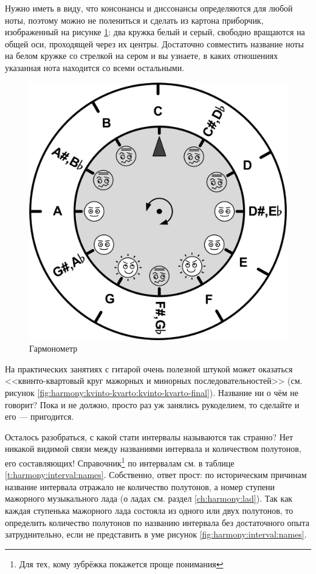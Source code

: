 Нужно иметь в виду, что консонансы и диссонансы определяются для любой ноты, поэтому можно не полениться и сделать из картона приборчик, изображенный на рисунке \ref{fig:harmony:interval:octave-kon-dis}: два кружка белый и серый, свободно вращаются на общей оси, проходящей через их центры. Достаточно совместить название ноты на белом кружке со стрелкой на сером и вы узнаете, в каких отношениях указанная нота находится со всеми остальными.

\begin{figure}[!ht]
    \centering
    \includegraphics[scale=0.7]{fig/intervals/octave-kon-dis} 
    \caption{Гармонометр}\label{fig:harmony:interval:octave-kon-dis}
\end{figure} 

На практических занятиях с гитарой очень полезной штукой может оказаться <<квинто-квартовый круг мажорных и минорных последовательностей>> (см. рисунок \ref{fig:harmony:kvinto-kvarto:kvinto-kvarto-final}). Название ни о чём не говорит? Пока и не должно, просто раз уж занялись рукоделием, то сделайте и его --- пригодится.

Осталось разобраться, с какой стати интервалы называются так странно? Нет никакой видимой связи между названиями интервала и количеством полутонов, его составляющих! Справочник\footnote{Для тех, кому зубрёжка покажется проще понимания} по интервалам см. в таблице \ref{t:harmony:interval:names}. Собственно, ответ прост: по историческим причинам название интервала отражало не количество полутонов, а номер ступени мажорного музыкального лада (о ладах см. раздел \ref{ch:harmony:lad}). Так как каждая ступенька мажорного лада состояла из одного или двух полутонов, то определить количество полутонов по названию интервала без достаточного опыта затруднительно, если не представить в уме рисунок \ref{fig:harmony:interval:names}.

